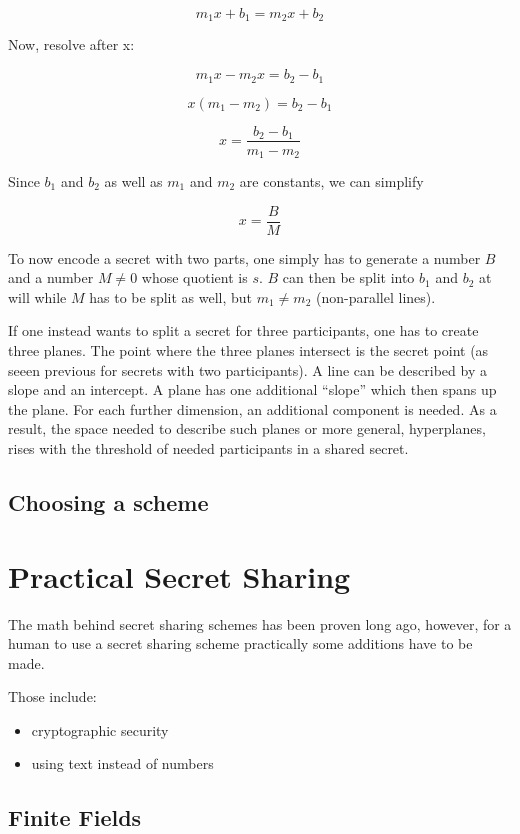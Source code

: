 $$m_1x + b_1 = m_2x + b_2$$

Now, resolve after x:

$$m_1x - m_2x = b_2 - b_1 $$

$$x (m_1 - m_2) = b_2 - b_1$$

$$x = \frac{b_2 - b_1}{m_1 - m_2}$$

Since $b_1$ and $b_2$ as well as $m_1$ and $m_2$ are constants, we can simplify

$$x = \frac{B}{M}$$

To now encode a secret with two parts, one simply has to generate a number $B$
and a number $M \neq 0$ whose quotient is $s$.
$B$ can then be split into $b_1$ and $b_2$ at will
while $M$ has to be split as well, but $m_1 \neq m_2$ (non-parallel lines).

If one instead wants to split a secret for three participants, one has to
create three planes. The point where the three planes intersect
is the secret point (as seeen previous for secrets with two participants).
A line can be described by a slope and an intercept. A plane has one
additional ``slope'' which then spans up the plane. For each further
dimension, an additional component is needed. As a result, the space needed
to describe such planes or more general, hyperplanes, rises with the
threshold of needed participants in a shared secret.

\subsection{Choosing a scheme}

\section{Practical Secret Sharing}

The math behind secret sharing schemes has been proven long ago, however, for a
human to use a secret sharing scheme practically some additions have to be
made.

Those include:

\begin{itemize}
  \item cryptographic security
  \item using text instead of numbers
\end{itemize}

\subsection{Finite Fields}

